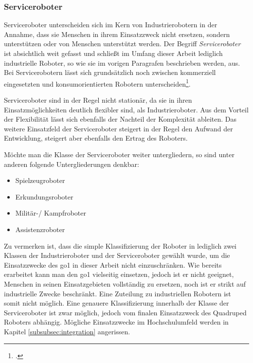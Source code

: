 \subsubsection{Serviceroboter}

Serviceroboter unterscheiden sich im Kern von Industrierobotern in der Annahme, dass sie Menschen in ihrem Einsatzzweck nicht ersetzen,
sondern unterstützen oder von Menschen unterstützt werden.
Der Begriff \emph{Serviceroboter} ist absichtlich weit gefasst und schließt im Umfang dieser Arbeit lediglich industrielle
Roboter, so wie sie im vorigen Paragrafen beschrieben werden, aus.
Bei Servicerobotern lässt sich grundsätzlich noch zwischen kommerziell eingesetzten und konsumorientierten Robotern unterscheiden\footcite{statista_robotics_market}.

Serviceroboter sind in der Regel nicht stationär, da sie in ihren Einsatzmöglichkeiten deutlich flexibler sind, als Industrieroboter.
Aus dem Vorteil der Flexibilität lässt sich ebenfalls der Nachteil der Komplexität ableiten.
Das weitere Einsatzfeld der Serviceroboter steigert in der Regel den Aufwand der Entwicklung, steigert aber ebenfalls
den Ertrag des Roboters.

Möchte man die Klasse der Serviceroboter weiter untergliedern, so sind unter anderen folgende Untergliederungen denkbar:

\begin{itemize}
    \item Spielzeugroboter
    \item Erkundungsroboter
    \item Militär-/ Kampfroboter
    \item Assistenzroboter
\end{itemize}

Zu vermerken ist, dass die simple Klassifizierung der Roboter in lediglich zwei Klassen der Industrieroboter und der Serviceroboter
gewählt wurde, um die Einsatzzwecke des \gls{go1} in dieser Arbeit nicht einzuschränken.
Wie bereits erarbeitet kann man den \gls{go1} vielseitig einsetzen, jedoch ist er nicht geeignet, Menschen in seinen Einsatzgebieten
vollständig zu ersetzen, noch ist er strikt auf industrielle Zwecke beschränkt.
Eine Zuteilung zu industriellen Robotern ist somit nicht möglich.
Eine genauere Klassifizierung innerhalb der Klasse der Serviceroboter ist zwar möglich, jedoch vom finalen Einsatzzweck des
Quadruped Roboters abhängig.
Mögliche Einsatzzwecke im Hochschulumfeld werden in Kapitel \ref{subsubsec:integration} angerissen.

